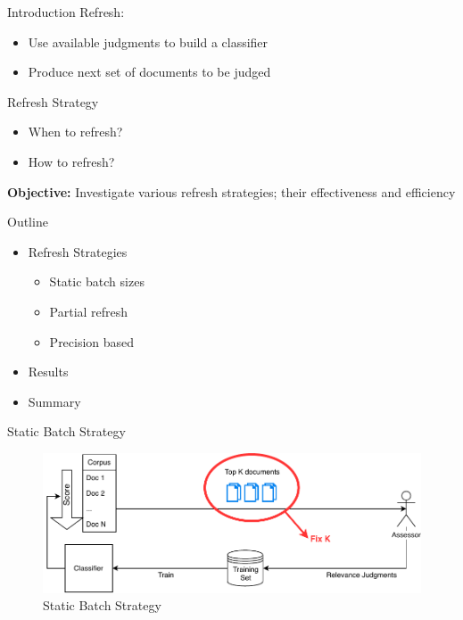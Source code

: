 \documentclass[14pt]{beamer}
\begin{document}
\begin{frame}{Introduction}
Refresh:
\begin{itemize}
    \item Use available judgments to build a classifier
    \item Produce next set of documents to be judged
\end{itemize}

\pause
\vskip 1cm
Refresh Strategy
\begin{itemize}
    \item When to refresh?
    \item How to refresh?
\end{itemize}

\pause
\vskip 1cm
\textbf{Objective: }
Investigate various refresh strategies; their effectiveness and efficiency
\end{frame}

\begin{frame}{Outline}
\begin{itemize}
    \item Refresh Strategies
    \begin{itemize}
        \item Static batch sizes
        \item Partial refresh
        \item Precision based
    \end{itemize}
    \item Results
    \item Summary
\end{itemize}
\end{frame}

\begin{frame}{Static Batch Strategy}
\begin{figure}
 \centering 
 \includegraphics[width=1.0\textwidth]{animation/static.pdf}
 \caption{Static Batch Strategy}
\end{figure}
\end{frame}
\end{document}
